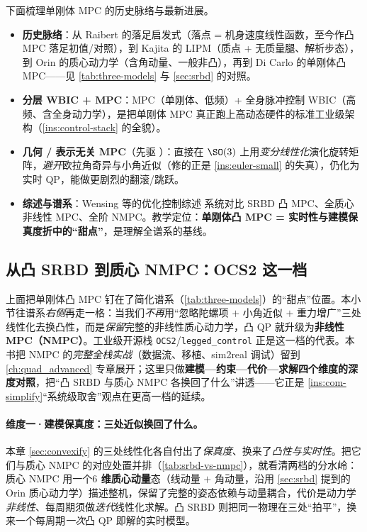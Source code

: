 \noindent 下面梳理单刚体 MPC 的历史脉络与最新进展。
\begin{itemize}
  \item \textbf{历史脉络}：从 Raibert 的落足启发式\cite{raibert1986legged}（落点 = 机身速度线性函数，至今作凸 MPC 落足初值/对照），到 Kajita 的 LIPM\cite{kajita2001lipm}（质点 + 无质量腿、解析步态），到 Orin 的质心动力学\cite{orin2013centroidal}（含角动量、一般非凸），再到 Di Carlo 的单刚体凸 MPC\cite{dicarlo2018cheetah}——见 \cref{tab:three-models} 与 \cref{sec:srbd} 的对照。
  \item \textbf{分层 WBIC + MPC}\cite{kim2019wbic}：MPC（单刚体、低频）+ 全身脉冲控制 WBIC（高频、含全身动力学），是把单刚体 MPC 真正跑上高动态硬件的标准工业级架构（\cref{ins:control-stack} 的全貌）。
  \item \textbf{几何 / 表示无关 MPC}\cite{ding2021repfree}（先驱 \cite{ding2019realtime}）：直接在 $\SO(3)$ 上用\emph{变分线性化}演化旋转矩阵，\emph{避开}欧拉角奇异与小角近似（修的正是 \cref{ins:euler-small} 的失真），仍化为实时 QP，能做更剧烈的翻滚/跳跃。
  \item \textbf{综述与谱系}：Wensing 等的优化控制综述\cite{wensing2024legged} 系统对比 SRBD 凸 MPC、全质心非线性 MPC、全阶 NMPC。教学定位：\textbf{单刚体凸 MPC = 实时性与建模保真度折中的“甜点”}，是理解全谱系的基线。
\end{itemize}

\subsection{从凸 SRBD 到质心 NMPC：OCS2 这一档}
\label{subsec:mpc-nmpc}

上面把单刚体凸 MPC 钉在了简化谱系（\cref{tab:three-models}）的“甜点”位置。本小节往谱系\emph{右侧}再走一格：当我们\emph{不再}用“忽略陀螺项 $+$ 小角近似 $+$ 重力增广”三处线性化去换凸性，而是\emph{保留}完整的非线性质心动力学，凸 QP 就升级为\textbf{非线性 MPC（NMPC）}。工业级开源栈 \texttt{OCS2}/\allowbreak\texttt{legged\_control}\cite{grandia2022perceptive,sleiman2021unified} 正是这一档的代表。本书把 NMPC 的\emph{完整全栈实战}（数据流、移植、sim2real 调试）留到 \cref{ch:quad_advanced} 专章展开；这里只做\textbf{建模—约束—代价—求解四个维度的深度对照}，把“凸 SRBD 与质心 NMPC 各换回了什么”讲透——它正是 \cref{ins:com-simplify}“系统级取舍”观点在更高一档的延续。

\paragraph{维度一·建模保真度：三处近似换回了什么。}
本章 \cref{sec:convexify} 的三处线性化各自付出了\emph{保真度}、换来了\emph{凸性与实时性}。把它们与质心 NMPC 的对应处置并排（\cref{tab:srbd-vs-nmpc}），就看清两档的分水岭：质心 NMPC 用一个\textbf{$6$ 维质心动量}态（线动量 $+$ 角动量，沿用 \cref{sec:srbd} 提到的 Orin 质心动力学\cite{orin2013centroidal}）描述整机，保留了完整的姿态依赖与动量耦合，代价是动力学\emph{非线性}、每周期须做\emph{迭代}线性化求解。凸 SRBD 则把同一物理在三处“拍平”，换来一个每周期\emph{一次}凸 QP 即解的实时模型。

